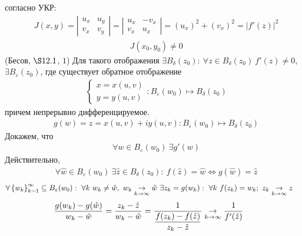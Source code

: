 согласно УКР:
\begin{align*}
  & J(x,y) = \left| \begin{matrix}
          u_x & u_y \\
          v_x & v_y
      \end{matrix} \right| = \left| \begin{matrix}
          u_x & -v_x \\
          v_x & u_x
      \end{matrix} \right| = (u_x)^2+(v_x)^2 = \left| f'(z) \right|^2
\end{align*}
\begin{align*}
  & J(x_0,y_0) \neq 0
\end{align*}
\theorem (Бесов, $\S 12.1$, $1$)
Для такого отображения $\exists B_\delta(z_0): \ \forall z \in B_\delta(z_0) \
f'(z) \neq 0 $, $\exists B_\varepsilon(z_0)$, где существует обратное
отображение
\begin{align*}
  & \left\{ \begin{matrix}
          x = x(u,v) \\
          y = y(u,v)
      \end{matrix} \right.: B_\varepsilon(w_0) \mapsto B_\delta(z_0)
\end{align*}
причем непрерывно дифференцируемое.
\pr
\begin{align*}
  & g(w) = z = x(u,v) + iy(u,v): B_\varepsilon(w_0) \mapsto B _\delta(z_0)
\end{align*}
Докажем, что
\begin{align*}
  &\forall w \in B_\varepsilon(w_0) \ \exists g'(w)
\end{align*}
Действительно,
\begin{align*}
  & \forall \hat{w} \in B_\varepsilon(w_0) \ \exists \hat{z} \in B_\delta(z_0): \ f(\hat{z}) = \hat{w} \Leftrightarrow g(\hat{w}) = \hat{z}
\end{align*}
\begin{align*}
  & \forall \left\{ w_k \right\}_{k=1}^\infty \subseteq B_\varepsilon(w_0): \ \forall k \ w_k \neq \hat{w}, \ w_k \underset{k \to \infty}{\to} \hat{w} \ \exists z_k = g(w_k): \ \forall k \ f(z_k) = w_k; \ z_k \underset{k \to \infty}{\to} z
\end{align*}
\begin{align*}
  & \frac{g(w_k) - g(\hat{w})}{w_k - \hat{w}} = \frac{z_k - \hat{z}}{w_k - \hat{w}} = \frac{1}{\displaystyle \frac{f(z_k) - f(\hat{z})}{z_k - \hat{z}}} \underset{k \to \infty}{\to} \frac{1}{f'(\hat{z})}
\end{align*}
\corollary
